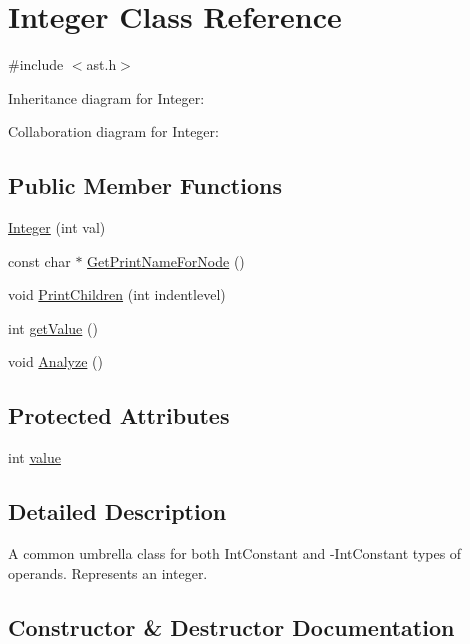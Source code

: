 \hypertarget{class_integer}{}\section{Integer Class Reference}
\label{class_integer}


{\ttfamily \#include $<$ast.\+h$>$}



Inheritance diagram for Integer\+:


Collaboration diagram for Integer\+:
\subsection*{Public Member Functions}
\begin{DoxyCompactItemize}
\item 
\hyperlink{class_integer_a70e6b2eb510b0a2714a00f1227a8edaf}{Integer} (int val)
\item 
const char $\ast$ \hyperlink{class_integer_ab4a1c2619f03557638a6740419337b82}{Get\+Print\+Name\+For\+Node} ()
\item 
void \hyperlink{class_integer_ac4122c2a26fe8825c4c3123f217a4021}{Print\+Children} (int indentlevel)
\item 
int \hyperlink{class_integer_aa3331a24fafb6e1c0fcf284ea9e88472}{get\+Value} ()
\item 
void \hyperlink{class_integer_ac3ffa2f3f2d9feaed58bbb2a5d8f1c59}{Analyze} ()
\end{DoxyCompactItemize}
\subsection*{Protected Attributes}
\begin{DoxyCompactItemize}
\item 
int \hyperlink{class_integer_a2ac4a32a4ba0682490bb55390a13749e}{value}
\end{DoxyCompactItemize}


\subsection{Detailed Description}
A common umbrella class for both \textquotesingle{}Int\+Constant\textquotesingle{} and \textquotesingle{}-\/\+Int\+Constant\textquotesingle{} types of operands. Represents an integer. 

\subsection{Constructor \& Destructor Documentation}
\mbox{\label{class_integer_a70e6b2eb510b0a2714a00f1227a8edaf}} 
